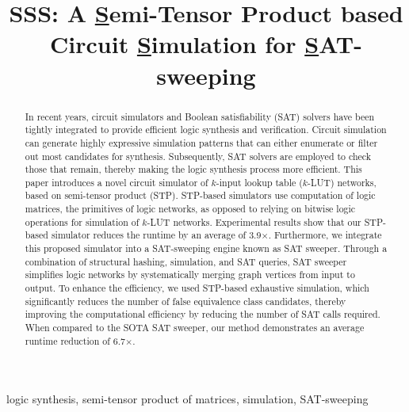 \documentclass[conference]{IEEEtran}
\begin{document}
\title{SSS: A \underline{S}emi-Tensor Product based Circuit \underline{S}imulation for \underline{S}AT-sweeping
}
\maketitle
\vspace{-10em}

\begin{abstract}
In recent years, circuit simulators and Boolean satisfiability (SAT) solvers have been tightly integrated to provide efficient logic synthesis and verification.
Circuit simulation can generate highly expressive simulation patterns that can either enumerate or filter out most candidates for synthesis.
Subsequently, SAT solvers are employed to check those that remain, thereby making the logic synthesis process more efficient.
This paper introduces a novel circuit simulator of $k$-input lookup table ($k$-LUT) networks, based on semi-tensor product (STP).
STP-based simulators use computation of logic matrices, the primitives of logic networks, as opposed to relying on bitwise logic operations for simulation of $k$-LUT networks.
Experimental results show that our STP-based simulator reduces the runtime by an average of 3.9$\times$.
Furthermore, we integrate this proposed simulator into a SAT-sweeping engine known as SAT sweeper.
Through a combination of structural hashing, simulation, and SAT queries, SAT sweeper simplifies logic networks by systematically merging graph vertices from input to output.
To enhance the efficiency, we used STP-based exhaustive simulation, which significantly reduces the number of false equivalence class candidates, thereby improving the computational efficiency by reducing the number of SAT calls required.
When compared to the SOTA SAT sweeper, our method demonstrates an average runtime reduction of 6.7$\times$.
\end{abstract}

\begin{IEEEkeywords}
logic synthesis, semi-tensor product of matrices, simulation, SAT-sweeping
\end{IEEEkeywords}
\end{document}

